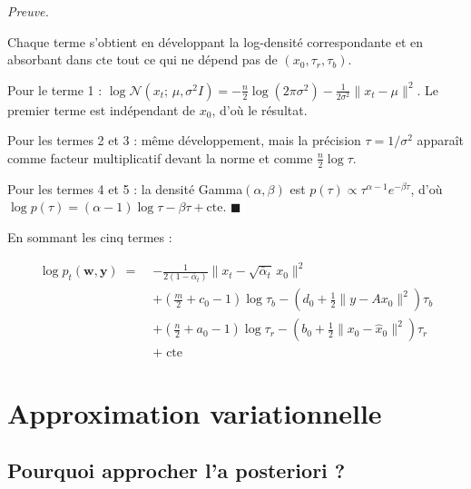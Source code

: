 \documentclass[12pt]{article}
\renewcommand{\qedsymbol}{$\blacksquare$}
\renewenvironment{proof}[1][\proofname]{%
  \par\medskip\noindent
  \textit{\color{proofgray}#1.}\enspace\ignorespaces
}{\hfill\qedsymbol\par\medskip}
\renewcommand{\proofname}{Preuve}
\begin{document}
 \begin{proof}





Chaque terme s'obtient en développant la log-densité correspondante et en absorbant dans $\mathrm{cte}$ tout ce qui ne dépend pas de $(x_0, \tau_r, \tau_b)$.

Pour le terme 
1 
: $\log \mathcal{N}(x_t;\, \mu, \sigma^2 I) = -\frac{n}{2}\log(2\pi\sigma^2) - \frac{1}{2\sigma^2}\|x_t - \mu\|^2$. Le premier terme est indépendant de $x_0$, d'où le résultat.

Pour les termes 
2 et 
3 
: même développement, mais la précision $\tau = 1/\sigma^2$ apparaît comme facteur multiplicatif devant la norme et comme $\frac{n}{2}\log\tau$.

Pour les termes 
4 et 
5 
: la densité Gamma$(\alpha, \beta)$ est $p(\tau) \propto \tau^{\alpha-1} e^{-\beta\tau}$, d'où $\log p(\tau) = (\alpha-1)\log\tau - \beta\tau + \mathrm{cte}$.
\end{proof}

En sommant les cinq termes 
:

\begin{resultbox}
\label{res:logjoint}
\begin{equation}
    \boxed{\begin{aligned}
        \log p_t(\boldsymbol{w}, \boldsymbol{y}) \;=\;
        &-\frac{1}{2(1-\bar\alpha_t)}\|x_t - \sqrt{\bar\alpha_t}\, x_0\|^2 \\[4pt]
        &+ \left(\frac{m}{2} + c_0 - 1\right)\log\tau_b - \left(d_0 + \tfrac{1}{2}\|y - Ax_0\|^2\right)\tau_b \\[4pt]
        &+ \left(\frac{n}{2} + a_0 - 1\right)\log\tau_r - \left(b_0 + \tfrac{1}{2}\|x_0 - \hat{x}_0\|^2\right)\tau_r \\[4pt]
        &+ \;\mathrm{cte}
    \end{aligned}}
    \label{eq:logjoint}
\end{equation}
\end{resultbox}


\section{Approximation variationnelle}

\subsection{Pourquoi approcher l'a posteriori ?}
\end{document}
